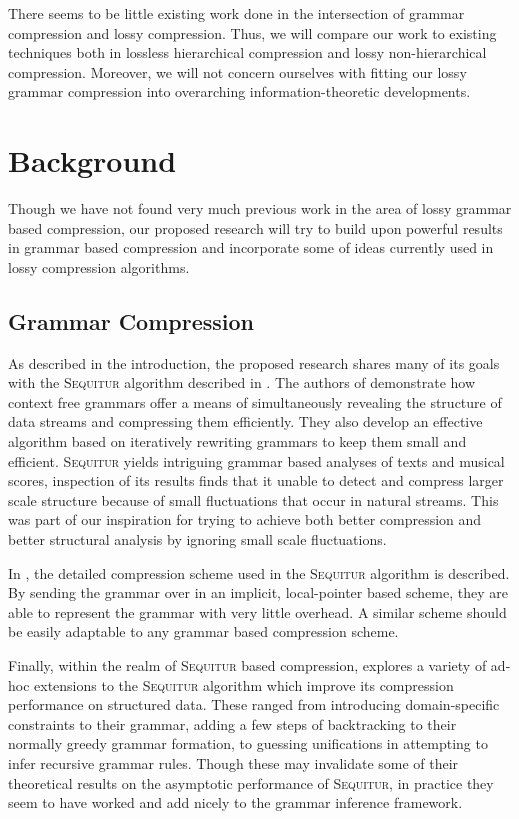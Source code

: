 \documentclass[11pt]{article}
\newcommand{\Sequitur}{\textsc{Sequitur}\xspace}
\begin{document}
There seems to be little existing work done in the intersection of grammar
compression and lossy compression.  Thus, we will compare our work to existing
techniques both in lossless hierarchical compression and lossy non-hierarchical
compression.  Moreover, we will not concern ourselves with fitting our lossy
grammar compression into overarching information-theoretic developments.

\section{Background}

Though we have not found very much previous work in the area of lossy grammar
based compression, our proposed research will try to build upon powerful
results in grammar based compression and incorporate some of ideas currently
used in lossy compression algorithms.

\subsection{Grammar Compression}

As described in the introduction, the proposed research shares many of its
goals with the \Sequitur algorithm described in \cite{sequitur}.  The authors
of \cite{sequitur} demonstrate how context free grammars offer a means of
simultaneously revealing the structure of data streams and compressing them
efficiently.  They also develop an effective algorithm based on iteratively
rewriting grammars to keep them small and efficient. \Sequitur yields
intriguing grammar based analyses of texts and musical scores, inspection of
its results finds that it unable to detect and compress larger scale structure
because of small fluctuations that occur in natural streams.  This was part of
our inspiration for trying to achieve both better compression and better
structural analysis by ignoring small scale fluctuations.

In \cite{sequitur2}, the detailed compression scheme used in the \Sequitur
algorithm is described.  By sending the grammar over in an implicit,
local-pointer based scheme, they are able to represent the grammar with very
little overhead.  A similar scheme should be easily adaptable to any grammar
based compression scheme.

Finally, within the realm of \Sequitur based compression, \cite{nevillphd}
explores a variety of ad-hoc extensions to the \Sequitur algorithm which
improve its compression performance on structured data.  These ranged from
introducing domain-specific constraints to their grammar, adding a few steps of
backtracking to their normally greedy grammar formation, to guessing
unifications in attempting to infer recursive grammar rules.  Though these may
invalidate some of their theoretical results on the asymptotic performance of
\Sequitur, in practice they seem to have worked and add nicely to the grammar
inference framework.
\end{document}

